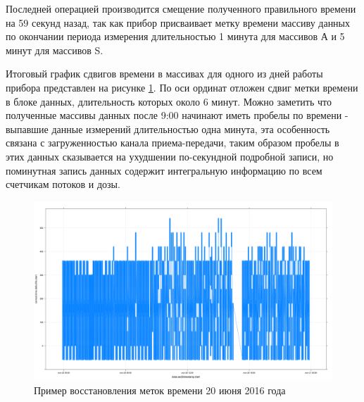 Последней операцией производится смещение полученного правильного времени на 59 
секунд назад, так как прибор присваивает метку времени массиву данных по окончании периода измерения длительностью 1 минута для массивов А и  5 минут для массивов S. 

Итоговый график сдвигов времени в массивах для одного из дней работы прибора представлен на рисунке \ref{fig:deprontime172}. По оси ординат отложен сдвиг метки времени в блоке данных, длительность которых около 6 минут. Можно заметить что полученные массивы данных после 9:00 начинают иметь пробелы по времени - выпавшие данные измерений длительностью одна минута, эта особенность связана с загруженностью канала приема-передачи, таким образом пробелы в этих данных сказывается на ухудшении по-секундной подробной записи, но поминутная запись данных содержит интегральную информацию по всем счетчикам потоков и дозы.






\begin{figure}
	\centering
	\includegraphics[width=0.9\linewidth]{images/depron_time_172}
	\caption{Пример восстановления меток времени 20 июня 2016 года}
	\label{fig:deprontime172}
\end{figure}






